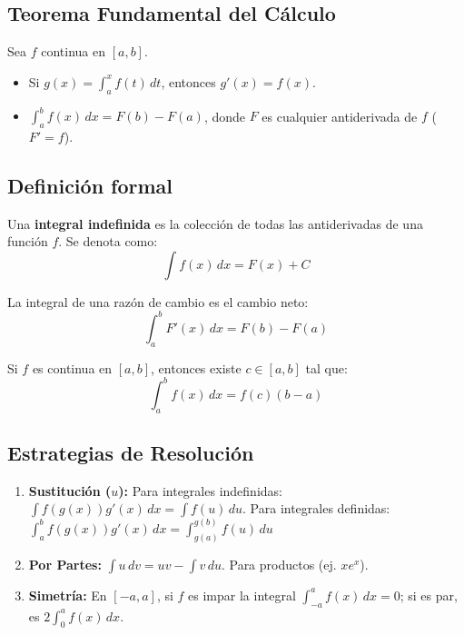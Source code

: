 \documentclass[a4paper,12pt]{article}
\theoremstyle{definition}
\begin{document}
\subsection{Teorema Fundamental del Cálculo}
Sea $f$ continua en $[a,b]$.
    \begin{itemize}
        \item Si $g(x) = \int_{a}^{x} f(t) \, dt$, entonces $g'(x) = f(x)$.
        \item $\int_{a}^{b} f(x) \, dx = F(b) - F(a)$, donde $F$ es cualquier antiderivada de $f$ ($F' = f$).
    \end{itemize}

\subsection{Definición formal}
Una \textbf{integral indefinida} es la colección de todas las antiderivadas de una función $f$. Se denota como:
    \[ \int f(x) \, dx = F(x) + C \]



\begin{tcolorbox}[title=Teorema del cambio neto]
    La integral de una razón de cambio es el cambio neto:
    \[ \int_a^b F'(x) \, dx = F(b) - F(a) \]
\end{tcolorbox}

\begin{tcolorbox}[title=TVM en integrales]
    Si $f$ es continua en $[a,b]$, entonces existe $c \in [a,b]$ tal que:
    \[ \int_{a}^{b} f(x) \, dx = f(c)(b-a) \]
\end{tcolorbox}


\subsection{Estrategias de Resolución}
\begin{enumerate}
    \item \textbf{Sustitución ($u$):} Para integrales indefinidas: $\int f(g(x))g'(x) \, dx = \int f(u) \, du$. Para integrales definidas: $\int_a^b f(g(x))g'(x) \, dx = \int_{g(a)}^{g(b)} f(u) \, du$
    \item \textbf{Por Partes:} $\int u \, dv = uv - \int v \, du$. Para productos (ej. $x e^x$).
    \item \textbf{Simetría:} En $[-a, a]$, si $f$ es impar la integral $\int_{-a}^a f(x) \, dx = 0$; si es par, es $2\int_0^a f(x) \, dx$.
\end{enumerate}
\end{document}
